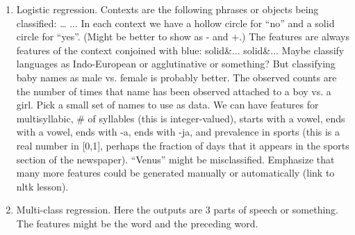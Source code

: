 \documentclass[11pt,letterpaper]{article}
\begin{document}
\begin{enumerate}
\item Logistic regression.  Contexts are the following phrases or objects being classified:
…
...
In each context we have a hollow circle for “no” and a solid circle for “yes”.  (Might be better to show as  - and +.)  The features are always features of the context conjoined with blue:
solid\&...
solid\&...
Maybe classify languages as Indo-European or agglutinative or something?  But classifying baby names as male vs. female is probably better.  The observed counts are the number of times that name has been observed attached to a boy vs. a girl.  Pick a small set of names to use as data.  We can have features for multisyllabic, \# of syllables (this is integer-valued), starts with a vowel, ends with a vowel, ends with -a, ends with -ja, and prevalence in sports (this is a real number in [0,1], perhaps the fraction of days that it appears in the sports section of the newspaper).  “Venus” might be misclassified.  Emphasize that many more features could be generated manually or automatically (link to nltk lesson).
\item Multi-class regression.  Here the outputs are 3 parts of speech or something.  The features might be the word and the preceding word.  
\end{enumerate}



\end{document}
